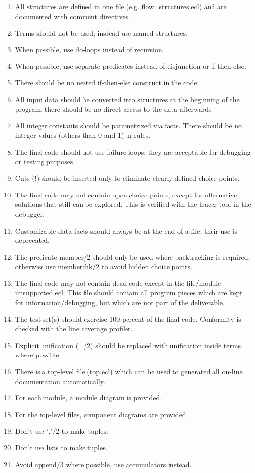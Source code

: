 \begin{enumerate}
\item  All structures are defined in one file (e.g. flow\_structures.ecl) and are documented with comment directives.
\item  Terms should not be used; instead use named structures.
\item  When possible, use do-loops instead of recursion.
\item  When possible, use separate predicates instead of disjunction or if-then-else.
\item  There should be no nested if-then-else construct in the code.
\item  All input data should be converted into structures at the beginning of the program; there should be no direct access to the data afterwards. 
\item  All integer constants should be parametrized via facts. There should be no integer values (others than 0 and 1) in rules.
\item  The final code should not use failure-loops; they are acceptable for debugging or testing purposes.
\item  Cuts (!)  should be inserted only to eliminate clearly defined choice points.
\item  The final code may not contain open choice points, except for alternative solutions that still can be explored. This is verified with the tracer tool in the debugger.
\item  Customizable data facts should always be at the end of a file; their use is deprecated.
\item  The predicate member/2 should only be used where backtracking is required; otherwise use memberchk/2 to avoid hidden choice points.
\item  The final code may not contain dead code except in the file/module unsupported.ecl. This file should contain all program pieces which are kept for information/debugging, but which are not part of the deliverable.
\item  The test set(s) should exercise 100 percent of the final code. Conformity is checked with the line coverage profiler.
\item  Explicit unification (=/2) should be replaced with unification inside terms where possible.
\item  There is a top-level file (top.ecl) which can be used to generated all on-line documentation automatically.
\item  For each module, a module diagram is provided.
\item  For the top-level files, component diagrams are provided.
\item  Don't use ','/2 to make tuples.
\item  Don't use lists to make tuples.
\item  Avoid append/3 where possible, use accumulators instead.
\end{enumerate}

